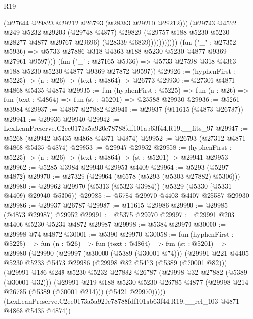 \begin{lexlean}{R19}
\begin{coremodule}
                              (@27644 @29823 @29212 @26793 (@28383 @29210 @29212)))
                            (@29743
                              @4522
                              @249
                              @5232
                              @29203
                              (@29748 @4877)
                              @29829
                              (@29757 @188 @5230 @5230 @28277 @4877 @29767 @29696)
                              (@28339 @6839)))))))))))
          (fun ("_" : @27352 @5936) =>
          @5733 @27886 @318 @4363 @188 @5230 @5230 @4877 @9369 @27961 @9597)))
      (fun ("_" : @27165 @5936) =>
      @5733 @27598 @318 @4363 @188 @5230 @5230 @4877 @9369 @27872 @9597))
@29926 := (hyphenFirst : @5225) -> (n : @26) -> (text : @4864) -> @26773
@29930 := @27306 @4871 @4868 @5435 @4874
@29935 := fun (hyphenFirst : @5225) =>
  fun (n : @26) => fun (text : @4864) => fun (st : @5201) => @25588 @29930
@29936 := @5261 @3984
@29937 := @4867 @27882
@29940 := @29937 (@11615 (@4873 @26787))
@29941 := @29936 @29940
@29942 := LexLeanPreserve.C2ee0173a5a920c78788fdf101ab63f44.R19.__fits_97
@29947 := @5268 (@29942 @5435 @4868 @4871 @4874)
@29952 := @26793 (@27312 @4871 @4868 @5435 @4874)
@29953 := @29947 @29952
@29958 := (hyphenFirst : @5225) -> (n : @26) -> (text : @4864) -> (st : @5201) -> @29941 @29953
@29962 := @5285 @3984 @29940 @29953 @4409
@29964 := @5293 (@5297 @4872)
@29970 := @27329 (@29964 (@6578 (@5293 (@5303 @27882) @5306)))
@29980 := @29962 @29970 (@5313 (@5323 @3984)) (@5329 (@5330 (@5331 @4409) @29940 @5306))
@29985 := @5784 @29970 @4403 @4407 @25587 @29930
@29986 := @29937 @26787
@29987 := @11615 @29986
@29990 := @29985 (@4873 @29987) @29952
@29991 := @5375 @29970
@29997 := @29991 @203 @4406 @5230 @5234 @4872 @29987
@29998 := @5384 @29970
@30000 := @29998 @74 @4872
@30001 := @5390 @29970
@30058 := fun (hyphenFirst : @5225) =>
  fun (n : @26) =>
  fun (text : @4864) =>
  fun (st : @5201) =>
  @29980
    (@29990
      (@29997
        (@30000 (@5389 (@30001 @74)))
        (@29991
          @221
          @4405
          @5230
          @5233
          @5473
          @29986
          (@29998 @82 @5473 (@5389 (@30001 @82)))
          (@29991
            @186
            @249
            @5230
            @5232
            @27882
            @26787
            (@29998 @32 @27882 (@5389 (@30001 @32)))
            (@29991
              @219
              @188
              @5230
              @5230
              @26785
              @4877
              (@29998 @214 @26785 (@5389 (@30001 @214)))
              (@5421 @29970)))))
      (LexLeanPreserve.C2ee0173a5a920c78788fdf101ab63f44.R19.__rel_103 @4871 @4868 @5435 @4874))

\end{coremodule}
\end{lexlean}
